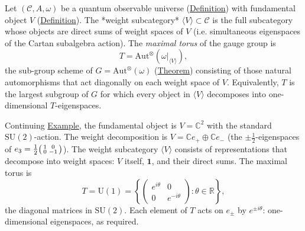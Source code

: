 \begin{definition}
  \label{def:maximal-torus}
Let $(\mathcal{C}, A, \omega)$ be a quantum observable universe
(\hyperref[def:quantum-observable-universe]{Definition}) with fundamental
object $V$ (\hyperref[def:spin-labels]{Definition}). The *weight
subcategory* $\langle V \rangle \subset \mathcal{C}$ is the full
subcategory whose objects are direct sums of weight spaces of $V$
(i.e. simultaneous eigenspaces of the Cartan subalgebra action).
The \emph{maximal torus} of the gauge group is
\[
T = \mathrm{Aut}^{\otimes}(\omega|_{\langle V \rangle}),
\]
the sub-group scheme of
$G = \mathrm{Aut}^{\otimes}(\omega)$
(\hyperref[thm:su2-emergence]{Theorem}) consisting of those natural
automorphisms that act diagonally on each weight space of $V$.
Equivalently, $T$ is the largest subgroup of $G$ for which every
object in $\langle V \rangle$ decomposes into one-dimensional
$T$-eigenspaces.
\end{definition}

\begin{example}
  \label{ex:maximal-torus-su2}
Continuing \hyperref[ex:spin-labels-su2]{Example}, the fundamental object is
$V = \mathbb{C}^2$ with the standard $\mathrm{SU}(2)$-action. The
weight decomposition is $V = \mathbb{C} e_+ \oplus \mathbb{C} e_-$
(the $\pm\tfrac{1}{2}$-eigenspaces of
$e_3 = \frac{1}{2}\begin{psmallmatrix} 1 & 0 \\ 0 & -1 \end{psmallmatrix}$).
The weight subcategory $\langle V \rangle$ consists of representations
that decompose into weight spaces: $V$ itself, $\mathbf{1}$, and their
direct sums. The maximal torus is
\[
T = \mathrm{U}(1)
  = \left\{
    \begin{pmatrix} e^{i\theta} & 0 \\ 0 & e^{-i\theta} \end{pmatrix}
    : \theta \in \mathbb{R}
  \right\},
\]
the diagonal matrices in $\mathrm{SU}(2)$. Each element of $T$ acts on
$e_{\pm}$ by $e^{\pm i\theta}$: one-dimensional eigenspaces, as required.
\end{example}

